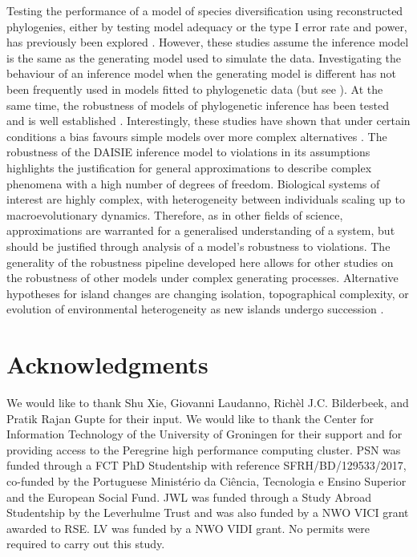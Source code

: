 \documentclass{article}
\begin{document}
Testing the performance of a model of species diversification using reconstructed phylogenies, either by testing model adequacy or the type I error rate and power, has previously been explored \citep{davis_exploring_2013, pennell_model_2015, rabosky_model_2015, etienne_how_2016}. However, these studies assume the inference model is the same as the generating model used to simulate the data. Investigating the behaviour of an inference model when the generating model is different has not been frequently used in models fitted to phylogenetic data (but see \cite{simonet_robustness_2018}). At the same time, the robustness of models of phylogenetic inference has been tested and is well established \citep{huelsenbeck_performance_1995, bilderbeek_quantifying_2021}. Interestingly, these studies have shown that under certain conditions a bias favours simple models over more complex alternatives \citep{yang_how_1997, bruno_topological_1999}. The robustness of the DAISIE inference model to violations in its assumptions highlights the justification for general approximations to describe complex phenomena with a high number of degrees of freedom. Biological systems of interest are highly complex, with heterogeneity between individuals scaling up to macroevolutionary dynamics. Therefore, as in other fields of science, approximations are warranted for a generalised understanding of a system, but should be justified through analysis of a model’s robustness to violations. The generality of the robustness pipeline developed here allows for other studies on the robustness of other models under complex generating processes. Alternative hypotheses for island changes are changing isolation, topographical complexity, or evolution of environmental heterogeneity as new islands undergo succession \citep{massol_island_2017, barajasbarbosa_environmental_2020}.

\section*{Acknowledgments}

We would like to thank Shu Xie, Giovanni Laudanno, Richèl J.C. Bilderbeek, and Pratik Rajan Gupte for their input. We would like to thank the Center for Information Technology of the University of Groningen for their support and for providing access to the Peregrine high performance computing cluster. PSN was funded through a FCT PhD Studentship with reference SFRH/BD/129533/2017, co-funded by the Portuguese Ministério da Ciência, Tecnologia e Ensino Superior and the European Social Fund. JWL was funded through a Study Abroad Studentship by the Leverhulme Trust and was also funded by a NWO VICI grant awarded to RSE. LV was funded by a NWO VIDI grant. No permits were required to carry out this study.
\end{document}
